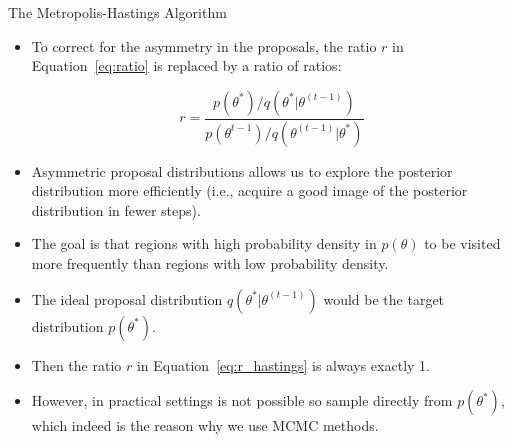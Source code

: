 \documentclass[handout]{beamer}
\begin{document}
\begin{frame}[fragile]{The Metropolis-Hastings Algorithm}
\scriptsize{

\begin{itemize}


\item To correct for the asymmetry in the proposals, the ratio $r$ in Equation~\ref{eq:ratio} is replaced by a ratio of ratios:

\begin{equation}\label{eq:r_hastings}
r = \frac{p(\theta^*)/q(\theta^{*}|\theta^{(t-1)})}{p(\theta^{t-1})/q(\theta^{(t-1)}|\theta^{*})}
\end{equation}




\item Asymmetric proposal distributions allows us to explore the posterior distribution more efficiently (i.e., acquire a good image of the posterior distribution in fewer steps).

\item The goal is that regions with high probability density in $p(\theta)$ to be visited more frequently than regions with low probability density.

\item The ideal proposal distribution $q(\theta^{*}|\theta^{(t-1)})$ would be the target distribution $p(\theta^{*})$.

\item Then the ratio $r$ in Equation~\ref{eq:r_hastings} is always exactly 1.

\item However, in practical settings is not possible so sample directly from $p(\theta^{*})$, which indeed is the reason why we use MCMC methods.

\end{itemize}


}
\end{frame}
\end{document}
